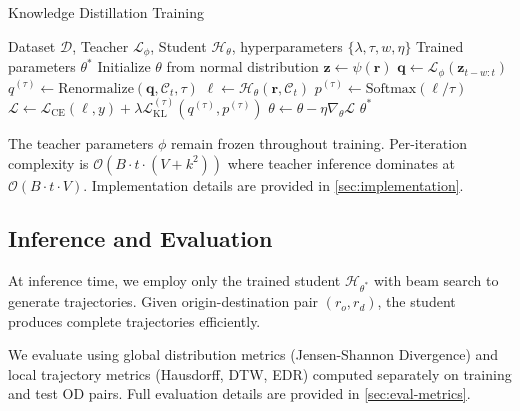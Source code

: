 \begin{algorithm}[t]
    \caption{Knowledge Distillation Training}
    \label{alg:distillation}
    \begin{algorithmic}[1]
        \Require Dataset $\mathcal{D}$, Teacher $\mathcal{L}_\phi$, Student $\mathcal{H}_\theta$, hyperparameters $\{\lambda, \tau, w, \eta\}$
        \Ensure Trained parameters $\theta^*$
        \State Initialize $\theta$ from normal distribution
        \State $\mathbf{z} \gets \psi(\mathbf{r})$ 
        \State $\mathbf{q} \gets \mathcal{L}_\phi(\mathbf{z}_{t-w:t})$ 
        \State $q^{(\tau)} \gets \text{Renormalize}(\mathbf{q}, \mathcal{C}_t, \tau)$ 
        \State $\boldsymbol{\ell} \gets \mathcal{H}_\theta(\mathbf{r}, \mathcal{C}_t)$ 
        \State $p^{(\tau)} \gets \text{Softmax}(\boldsymbol{\ell} / \tau)$
        \State $\mathcal{L} \gets \mathcal{L}_{\text{CE}}(\boldsymbol{\ell}, y) + \lambda \mathcal{L}_{\text{KL}}^{(\tau)}(q^{(\tau)}, p^{(\tau)})$
        \State $\theta \gets \theta - \eta \nabla_\theta \mathcal{L}$
        \EndFor
        \EndFor
        \State \Return $\theta^*$
    \end{algorithmic}
\end{algorithm}

The teacher parameters $\phi$ remain frozen throughout training. Per-iteration complexity is $\mathcal{O}(B \cdot t \cdot (V + k^2))$ where teacher inference dominates at $\mathcal{O}(B \cdot t \cdot V)$. Implementation details are provided in \autoref{sec:implementation}.

\subsection{Inference and Evaluation}
\label{sec:method-inference}

At inference time, we employ only the trained student $\mathcal{H}_{\theta^*}$ with beam search to generate trajectories. Given origin-destination pair $(r_o, r_d)$, the student produces complete trajectories efficiently.

We evaluate using global distribution metrics (Jensen-Shannon Divergence) and local trajectory metrics (Hausdorff, DTW, EDR) computed separately on training and test OD pairs. Full evaluation details are provided in \autoref{sec:eval-metrics}.